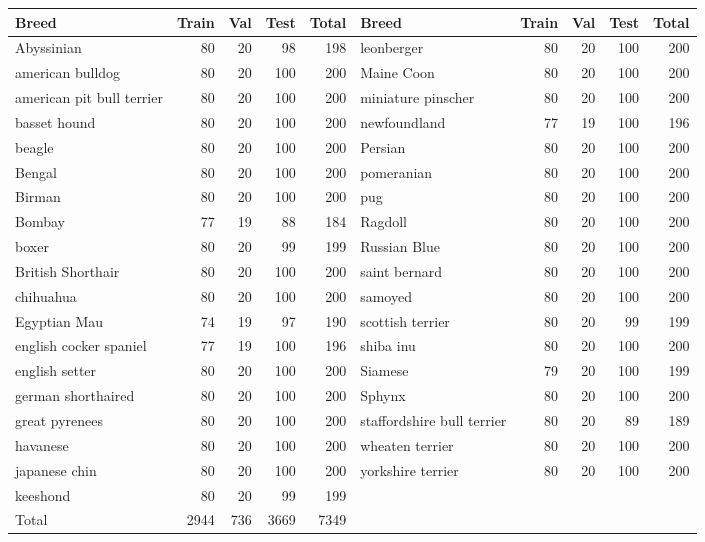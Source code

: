 \begin{tabular}{lrrrr@{\hskip 12pt}lrrrr}
\toprule
Breed & Train & Val & Test & Total & Breed & Train & Val & Test & Total \\
\midrule
Abyssinian & 80 & 20 & 98 & 198 & leonberger & 80 & 20 & 100 & 200 \\
american bulldog & 80 & 20 & 100 & 200 & Maine Coon & 80 & 20 & 100 & 200 \\
american pit bull terrier & 80 & 20 & 100 & 200 & miniature pinscher & 80 & 20 & 100 & 200 \\
basset hound & 80 & 20 & 100 & 200 & newfoundland & 77 & 19 & 100 & 196 \\
beagle & 80 & 20 & 100 & 200 & Persian & 80 & 20 & 100 & 200 \\
Bengal & 80 & 20 & 100 & 200 & pomeranian & 80 & 20 & 100 & 200 \\
Birman & 80 & 20 & 100 & 200 & pug & 80 & 20 & 100 & 200 \\
Bombay & 77 & 19 & 88 & 184 & Ragdoll & 80 & 20 & 100 & 200 \\
boxer & 80 & 20 & 99 & 199 & Russian Blue & 80 & 20 & 100 & 200 \\
British Shorthair & 80 & 20 & 100 & 200 & saint bernard & 80 & 20 & 100 & 200 \\
chihuahua & 80 & 20 & 100 & 200 & samoyed & 80 & 20 & 100 & 200 \\
Egyptian Mau & 74 & 19 & 97 & 190 & scottish terrier & 80 & 20 & 99 & 199 \\
english cocker spaniel & 77 & 19 & 100 & 196 & shiba inu & 80 & 20 & 100 & 200 \\
english setter & 80 & 20 & 100 & 200 & Siamese & 79 & 20 & 100 & 199 \\
german shorthaired & 80 & 20 & 100 & 200 & Sphynx & 80 & 20 & 100 & 200 \\
great pyrenees & 80 & 20 & 100 & 200 & staffordshire bull terrier & 80 & 20 & 89 & 189 \\
havanese & 80 & 20 & 100 & 200 & wheaten terrier & 80 & 20 & 100 & 200 \\
japanese chin & 80 & 20 & 100 & 200 & yorkshire terrier & 80 & 20 & 100 & 200 \\
keeshond & 80 & 20 & 99 & 199 & & & & &  \\
\midrule
Total & 2944 & 736 & 3669 & 7349 & & & & & \\
\bottomrule
\end{tabular}